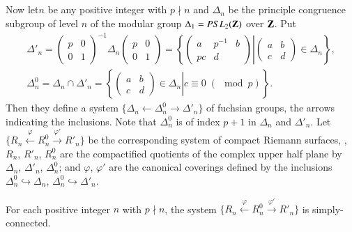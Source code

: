 \subsection{}\label{art6-subsec3.2}
Now let\pageoriginale $n$ be any positive integer with $p \nmid n$ and $\Delta_n$ be the principle congruence subgroup of level $n$ of the modular group $\Delta_1 = PSL_2 (\mathbf{Z})$ over $\mathbf{Z}$. Put
\begin{gather*}
\Delta'_n  = 
\begin{pmatrix} 
p & 0\\
0 & 1
\end{pmatrix}^{-1}
\Delta_n
\begin{pmatrix} 
p & 0 \\
0 & 1
\end{pmatrix} = 
\left\{
\left.
\begin{pmatrix} 
a & p^{-1} & b\\
pc & d
\end{pmatrix}
\right| 
\begin{pmatrix} 
a & b \\
c & d
\end{pmatrix} \in 
\Delta_n
 \right\},\\
\Delta^0_n = \Delta_n \cap \Delta'_n = \left\{ \left. 
\begin{pmatrix} 
a & b \\
c & d
\end{pmatrix} \in \Delta_n \right| c \equiv 0 \; (\mod p)
 \right\}.
\end{gather*}
Then they define a system $\{\Delta_n \leftarrow \Delta^0_n \rightarrow \Delta'_n\}$ of fuchsian groups, the arrows indicating the inclusions. Note that $\Delta^0_n$ is of index $p+1$ in $\Delta_n$ and $\Delta'_n$. Let $\{R_n \xleftarrow{\varphi} R^0_n \xrightarrow{\varphi'} R'_n\}$ be the corresponding system of compact Riemann surfaces, \ie, $R_n$, $R'_n$, $R^0_n$ are the compactified quotients of the complex upper half plane by $\Delta_n$, $\Delta'_n$, $\Delta^0_n$; and $\varphi$, $\varphi'$ are the canonical coverings defined by the inclusions $\Delta^0_n \hookrightarrow \Delta_n$, $\Delta^0_n \hookrightarrow \Delta'_n$.

\setcounter{lemma}{1}
\begin{lemma}\label{art6-lem3.2}
For each positive integer $n$ with $p \nmid n$, the system $\{R_n \xleftarrow{\varphi} R^0_n \xrightarrow{\varphi'} R'_n \}$ is simply-connected.
\end{lemma}


